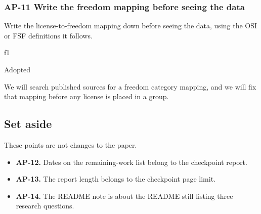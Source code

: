 \subsubsection*{AP-11 Write the freedom mapping before seeing the data}
\label{ap:11}

\begin{description}[leftmargin=0pt]
  \item[Point] Write the license-to-freedom mapping down before seeing the data, using the OSI or FSF definitions it follows.
  \item[Source] f1
  \item[Decision] Adopted
  \item[Reasoning] We will search published sources for a freedom category mapping, and we will fix that mapping before any license is placed in a group.
\end{description}

\subsection*{Set aside}
\label{ap:set-aside}

These points are not changes to the paper.

\begin{itemize}
  \item \textbf{AP-12.} Dates on the remaining-work list belong to the checkpoint report.
  \item \textbf{AP-13.} The report length belongs to the checkpoint page limit.
  \item \textbf{AP-14.} The README note is about the README still listing three research questions.
\end{itemize}
